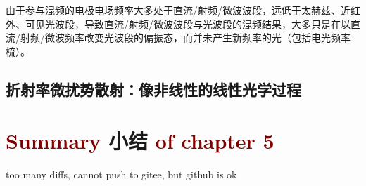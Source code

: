 由于参与混频的电极电场频率大多处于直流/射频/微波波段，远低于太赫兹、近红外、可见光波段，导致直流/射频/微波波段与光波段的混频结果，大多只是在以直流/射频/微波频率改变光波段的偏振态，而并未产生新频率的光（包括电光频率梳）。

\subsection{折射率微扰势散射：像非线性的线性光学过程}\label{ssec:cross-correlation}

\section{\textcolor{Maroon}{Summary} 小结 \textcolor{Maroon}{of chapter 5}}\label{sec:summary-chapter5}

\cite{dregerSecondharmonicGenerationNonlinear1990,zubairyAnalyticApproachSecondharmonic1985}

too many diffs, cannot push to gitee, but github is ok

\cite{katoSecondharmonicGeneration20481986,katoTemperaturetuned90Phasematching1994,brunerTemperaturedependentSellmeierEquation2003,jundtTemperaturedependentSellmeierEquation1997,katoSellmeierThermoopticDispersion2002}